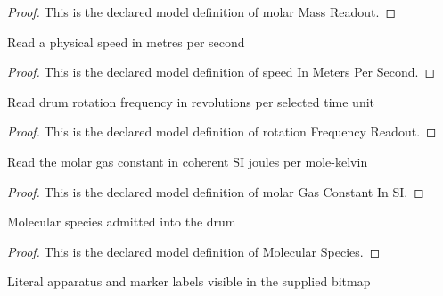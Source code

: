 \begin{proof}
  This is the declared model definition of molar Mass Readout.
\end{proof}
\begin{definition}
  \label{def:physics:phyx-mini-0564:phyxminiproblems-problemphyxmini0564-speedinmeterspersecond}
  Read a physical speed in metres per second
\end{definition}
\begin{proof}
  This is the declared model definition of speed In Meters Per Second.
\end{proof}
\begin{definition}
  \label{def:physics:phyx-mini-0564:phyxminiproblems-problemphyxmini0564-rotationfrequencyreadout}
  Read drum rotation frequency in revolutions per selected time unit
\end{definition}
\begin{proof}
  This is the declared model definition of rotation Frequency Readout.
\end{proof}
\begin{definition}
  \label{def:physics:phyx-mini-0564:phyxminiproblems-problemphyxmini0564-molargasconstantinsi}
  Read the molar gas constant in coherent SI joules per mole-kelvin
\end{definition}
\begin{proof}
  This is the declared model definition of molar Gas Constant In SI.
\end{proof}
\begin{definition}
  \label{def:physics:phyx-mini-0564:phyxminiproblems-problemphyxmini0564-molecularspecies}
  Molecular species admitted into the drum
\end{definition}
\begin{proof}
  This is the declared model definition of Molecular Species.
\end{proof}
\begin{definition}
  \label{def:physics:phyx-mini-0564:phyxminiproblems-problemphyxmini0564-figurelabel}
  Literal apparatus and marker labels visible in the supplied bitmap
\end{definition}
